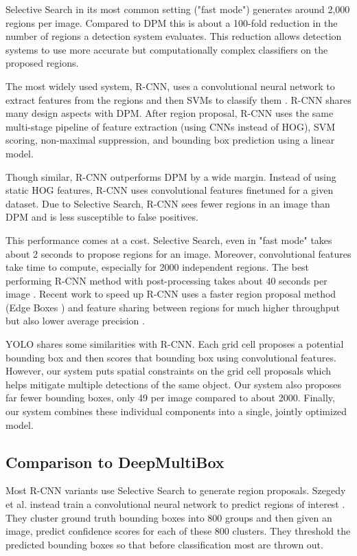 \documentclass{article} %
\begin{document}
Selective Search in its most common setting ("fast mode") generates around 2,000 regions per image. Compared to DPM this is about a 100-fold reduction in the number of regions a detection system evaluates. This reduction allows detection systems to use more accurate but computationally complex classifiers on the proposed regions.

The most widely used system, R-CNN, uses a convolutional neural network to extract features from the regions and then SVMs to classify them \cite{girshick2014rich}. R-CNN shares many design aspects with DPM. After region proposal, R-CNN uses the same multi-stage pipeline of feature extraction (using CNNs instead of HOG), SVM scoring, non-maximal suppression, and bounding box prediction using a linear model.

Though similar, R-CNN outperforms DPM by a wide margin. Instead of using static HOG features, R-CNN uses convolutional features finetuned for a given dataset. Due to Selective Search, R-CNN sees fewer regions in an image than DPM and is less susceptible to false positives.

This performance comes at a cost. Selective Search, even in "fast mode" takes about 2 seconds to propose regions for an image. Moreover, convolutional features take time to compute, especially for 2000 independent regions. The best performing R-CNN method with post-processing takes about 40 seconds per image \cite{DBLP:journals/corr/ZhuUSF15}. Recent work to speed up R-CNN uses a faster region proposal method (Edge Boxes \cite{zitnick2014edge}) and feature sharing between regions for much higher throughput but also lower average precision \cite{he2014spatial}.

YOLO shares some similarities with R-CNN. Each grid cell proposes a potential bounding box and then scores that bounding box using convolutional features. However, our system puts spatial constraints on the grid cell proposals which helps mitigate multiple detections of the same object. Our system also proposes far fewer bounding boxes, only 49 per image compared to about 2000. Finally, our system combines these individual components into a single, jointly optimized model.

\subsection{Comparison to DeepMultiBox}

Most R-CNN variants use Selective Search to generate region proposals. Szegedy et al. instead train a convolutional neural network to predict regions of interest \cite{erhan2014scalable}. They cluster ground truth bounding boxes into 800 groups and then given an image, predict confidence scores for each of these 800 clusters. They threshold the predicted bounding boxes so that before classification most are thrown out.
\end{document}
